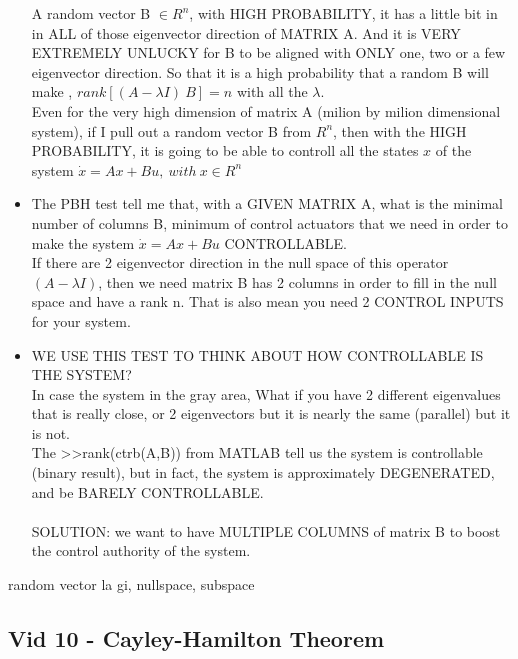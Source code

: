 \begin{itemize}
				A random vector B $\in R^n$, with HIGH PROBABILITY, it has a little bit in in ALL of those eigenvector direction of MATRIX A.
				And it is VERY EXTREMELY UNLUCKY for B to be aligned with ONLY one, two or a few eigenvector direction.
				So that it is a high probability that a random B will make , $rank[(A - \lambda I) ~B] = n $
				with all the $\lambda$.\\
				
				Even for the very high dimension of matrix A (milion by milion dimensional system),
				if I pull out a random vector B from $R^n$, then with the HIGH PROBABILITY, it is going to be able
				to controll all the states $x$ of the system $\dot{x} = Ax + Bu, ~with~ x\in R^n$

		\item The PBH test tell me that, with a GIVEN MATRIX A, what is the minimal number of columns B, 
				minimum of control actuators that we need in order to make the system $\dot{x} = Ax + Bu$ CONTROLLABLE.\\
		
				If there are 2 eigenvector direction in the null space of this operator $(A - \lambda I)$, 
				then we need matrix B has 2 columns in order to fill in the null space and have a rank n. 
				That is also mean you need 2 CONTROL INPUTS for your system.

		\item WE USE THIS TEST TO THINK ABOUT HOW CONTROLLABLE IS THE SYSTEM?\\
				In case the system in the gray area, What if you have 2 different eigenvalues that is really close,
				or 2 eigenvectors but it is nearly the same (parallel) but it is not.\\
				The >>rank(ctrb(A,B)) from MATLAB tell us the system is controllable (binary result), but in fact,
				the system is approximately DEGENERATED, and be BARELY CONTROLLABLE.\\
				\\SOLUTION: we want to have MULTIPLE COLUMNS of matrix B to boost the control authority of the system.
		\end{itemize}




random vector la gi, nullspace, subspace


\subsection{Vid 10 - Cayley-Hamilton Theorem}

